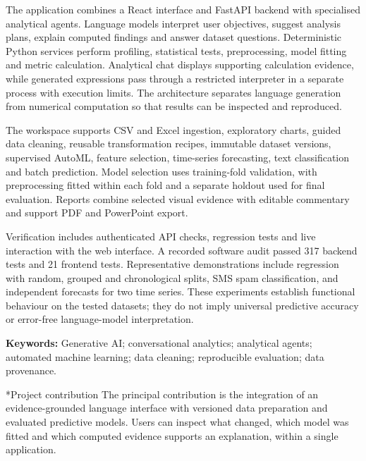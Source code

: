 \documentclass[11pt,a4paper]{article}
\makeatletter
\renewcommand\subsection{\@startsection{subsection}{2}{0pt}{-1.8ex plus -.3ex}{.65ex}{\normalsize\bfseries}}
\makeatother
\begin{document}
The application combines a React interface and FastAPI backend with specialised analytical agents. Language models interpret user objectives, suggest analysis plans, explain computed findings and answer dataset questions. Deterministic Python services perform profiling, statistical tests, preprocessing, model fitting and metric calculation. Analytical chat displays supporting calculation evidence, while generated expressions pass through a restricted interpreter in a separate process with execution limits. The architecture separates language generation from numerical computation so that results can be inspected and reproduced.

The workspace supports CSV and Excel ingestion, exploratory charts, guided data cleaning, reusable transformation recipes, immutable dataset versions, supervised AutoML, feature selection, time-series forecasting, text classification and batch prediction. Model selection uses training-fold validation, with preprocessing fitted within each fold and a separate holdout used for final evaluation. Reports combine selected visual evidence with editable commentary and support PDF and PowerPoint export.

Verification includes authenticated API checks, regression tests and live interaction with the web interface. A recorded software audit passed 317 backend tests and 21 frontend tests. Representative demonstrations include regression with random, grouped and chronological splits, SMS spam classification, and independent forecasts for two time series. These experiments establish functional behaviour on the tested datasets; they do not imply universal predictive accuracy or error-free language-model interpretation.

\vspace{.35cm}
\noindent\textbf{Keywords:} Generative AI; conversational analytics; analytical agents; automated machine learning; data cleaning; reproducible evaluation; data provenance.

\vspace{.6cm}
\subsection*{Project contribution}
The principal contribution is the integration of an evidence-grounded language interface with versioned data preparation and evaluated predictive models. Users can inspect what changed, which model was fitted and which computed evidence supports an explanation, within a single application.
\clearpage
\end{document}
